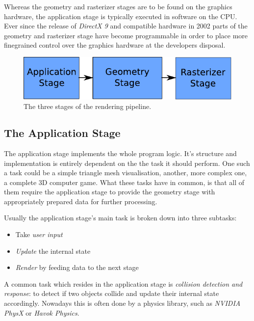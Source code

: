 Whereas the geometry and rasterizer stages are to be found on the graphics
hardware, the application stage is typically executed in software on the CPU.
Ever since the release of \textit{DirectX 9} and compatible hardware in 2002
parts of the geometry and rasterizer stage have become programmable in order
to place more finegrained control over the graphics hardware at the developers
disposal.

\begin{figure}
\begin{center}
\includegraphics[scale=0.8]{Images/Rendering-Pipeline-AGR.pdf}
\caption{The three stages of the rendering pipeline.}
\label{fig:RAGR}
\end{center}
\end{figure}

\subsection{The Application Stage}
The application stage implements the whole program logic. It's structure and
implementation is entirely dependent on the the task it should perform. One
such a task could be a simple triangle mesh visualisation, another, more
complex one, a complete 3D computer game. What these tasks have in common, is
that all of them require the application stage to provide the geometry stage
with appropriately prepared data for further processing.

Usually the application stage's main task is broken down into three subtasks:
\begin{itemize}
 \item Take \textit{user input}
 \item \textit{Update} the internal state
 \item \textit{Render} by feeding data to the next stage
\end{itemize}

A common task which resides in the application stage is \textit{collision
detection and response}: to detect if two objects collide and update their
internal state accordingly. Nowadays this is often done by a physics library,
such as \textit{NVIDIA PhysX}\cite{misc:ageia-physx} or \textit{Havok
Physics}\cite{misc:havok}.

